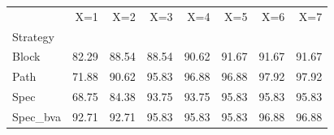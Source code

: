 \begin{tabular}{lrrrrrrr}
\toprule
 & X=1 & X=2 & X=3 & X=4 & X=5 & X=6 & X=7 \\
Strategy &  &  &  &  &  &  &  \\
\midrule
Block & 82.29 & 88.54 & 88.54 & 90.62 & 91.67 & 91.67 & 91.67 \\
Path & 71.88 & 90.62 & 95.83 & 96.88 & 96.88 & 97.92 & 97.92 \\
Spec & 68.75 & 84.38 & 93.75 & 93.75 & 95.83 & 95.83 & 95.83 \\
Spec_bva & 92.71 & 92.71 & 95.83 & 95.83 & 95.83 & 96.88 & 96.88 \\
\bottomrule
\end{tabular}
